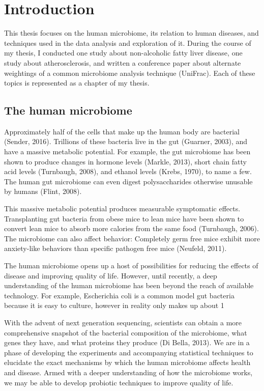 \chapter{Introduction}
This thesis focuses on the human microbiome, its relation to human diseases, and techniques used in the data analysis and exploration of it. During the course of my thesis, I conducted one study about non-alcoholic fatty liver disease, one study about atherosclerosis, and written a conference paper about alternate weightings of a common microbiome analysis technique (UniFrac). Each of these topics is represented as a chapter of my thesis.

\section{The human microbiome}
Approximately half of the cells that make up the human body are bacterial (Sender, 2016). Trillions of these bacteria live in the gut (Guarner, 2003), and have a massive metabolic potential. For example, the gut microbiome has been shown to produce changes in hormone levels (Markle, 2013), short chain fatty acid levels (Turnbaugh, 2008), and ethanol levels (Krebs, 1970), to name a few. The human gut microbiome can even digest polysaccharides otherwise unusable by humans (Flint, 2008).

This massive metabolic potential produces measurable symptomatic effects. Transplanting gut bacteria from obese mice to lean mice have been shown to convert lean mice to absorb more calories from the same food (Turnbaugh, 2006). The microbiome can also affect behavior: Completely germ free mice exhibit more anxiety-like behaviors than specific pathogen free mice (Neufeld, 2011).

The human microbiome opens up a host of possibilities for reducing the effects of disease and improving quality of life. However, until recently, a deep understanding of the human microbiome has been beyond the reach of available technology. For example, Escherichia coli is a common model gut bacteria because it is easy to culture, however in reality only makes up about 1%

With the advent of next generation sequencing, scientists can obtain a more comprehensive snapshot of the bacterial composition of the microbiome, what genes they have, and what proteins they produce (Di Bella, 2013). We are in a phase of developing the experiments and accompanying statistical techniques to elucidate the exact mechanisms by which the human microbiome affects health and disease. Armed with a deeper understanding of how the microbiome works, we may be able to develop probiotic techniques to improve quality of life.

